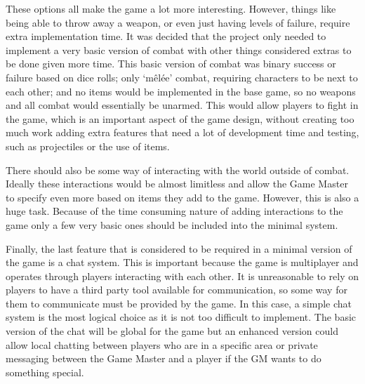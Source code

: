 These options all make the game a lot more interesting. However, things like being able to throw away a weapon, or even just having levels of failure, require extra implementation time. It was decided that the project only needed to implement a very basic version of combat with other things considered extras to be done given more time. This basic version of combat was binary success or failure based on dice rolls; only `mêlée' combat, requiring characters to be next to each other; and no items would be implemented in the base game, so no weapons and all combat would essentially be unarmed. This would allow players to fight in the game, which is an important aspect of the game design, without creating too much work adding extra features that need a lot of development time and testing, such as projectiles or the use of items.

There should also be some way of interacting with the world outside of combat. Ideally these interactions would be almost limitless and allow the Game Master to specify even more based on items they add to the game. However, this is also a huge task. Because of the time consuming nature of adding interactions to the game only a few very basic ones should be included into the minimal system.

Finally, the last feature that is considered to be required in a minimal version of the game is a chat system. This is important because the game is multiplayer and operates through players interacting with each other. It is unreasonable to rely on players to have a third party tool available for communication, so some way for them to communicate must be provided by the game. In this case, a simple chat system is the most logical choice as it is not too difficult to implement. The basic version of the chat will be global for the game but an enhanced version could allow local chatting between players who are in a specific area or private messaging between the Game Master and a player if the GM wants to do something special.





